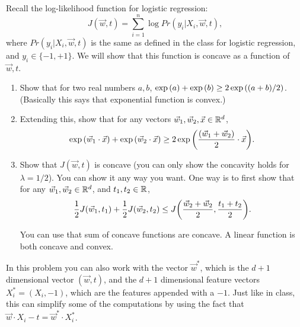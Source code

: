 \documentclass[11pt]{article}
\newenvironment{problem}[2][Problem]{\begin{trivlist}
\item[\hskip \labelsep {\bfseries #1}\hskip \labelsep {\bfseries #2.}]}{\end{trivlist}}
\begin{document}
\begin{problem}{3 (10 points)}
Recall the log-likelihood function for logistic regression:
\[
J(\vec w, t) = \sum_{i=1}^n \log Pr ( y_i|  X_i, \vec w, t), 
\]
where $Pr ( y_i|   X_i, \vec w, t)$ is the same as defined in the class for logistic regression, and $y_i\in\{-1,+1\}$. We will show that this function is concave as a function of $\vec w, t$.
\begin{enumerate}
\item 
Show that for two real numbers $a, b$, $\exp{\left({a}\right)}+\exp{\left({b}\right)}\ge 2 \exp{\left({(a+b)/2}\right)}$. (Basically this says that exponential function is convex.)
\item
Extending this, show that for any vectors $\vec w_1, \vec w_2, \vec x \in\mathbb{R}^d$, 
\[
\exp{\left({\vec w_1\cdot \vec x}\right)} + \exp{\left({\vec w_2\cdot \vec x}\right)} \ge 2\exp{\left({\frac{(\vec w_1 + \vec w_2)}2 \cdot \vec x}\right)}.
\]
\item
Show that $J(\vec w, t)$ is concave (you can only show the concavity holds for $\lambda=1/2$). You can show it any way you want. One way is to first show that for any $\vec w_1, \vec w_2 \in\mathbb{R}^d$, and $t_1, t_2\in\mathbb{R}$,  
\[
\frac{1}{2}J(\vec w_1, t_1)+\frac{1}{2}J(\vec w_2, t_2) \le J{\left({\frac{\vec w_2+\vec w_2 }2, \frac{t_1+t_2}2}\right)}.
\]

You can use that sum of concave functions are concave. A linear function is both concave and convex. 
\end{enumerate}

In this problem you can also work with the vector $\vec w^*$, which is the $d+1$ dimensional vector $(\vec w, t)$, and the $d+1$ dimensional feature vectors $ X_i^{*} = ( X_i, -1)$, which are the features appended with a $-1$. Just like in class, this can simplify some of the computations by using the fact that $\vec w\cdot  X_i -t = \vec w^{*}\cdot  X_i^*$. 
\end{problem}
\end{document}
